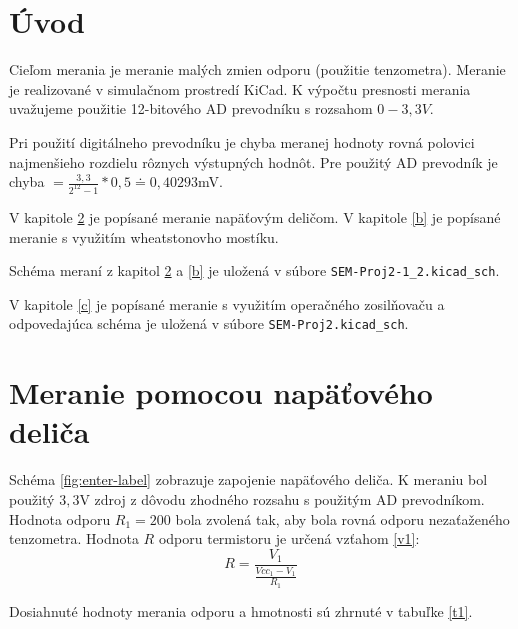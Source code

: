 \section{Úvod}
Cieľom merania je meranie malých zmien odporu (použitie tenzometra). Meranie je realizované v simulačnom prostredí KiCad. K výpočtu presnosti merania uvažujeme použitie 12-bitového AD prevodníku s rozsahom $0-3,3V$.

Pri použití digitálneho prevodníku je chyba meranej hodnoty rovná polovici najmenšieho rozdielu rôznych výstupných hodnôt. Pre použitý AD prevodník je chyba $ = \frac{3,3}{2^{12}-1}*0,5 \doteq 0,40293$mV. 

V kapitole \ref{a} je popísané meranie napäťovým deličom.
V kapitole \ref{b} je popísané meranie s využitím wheatstonovho mostíku.

Schéma meraní z kapitol \ref{a} a \ref{b} je uložená v súbore \texttt{SEM-Proj2-1\_2.kicad\_sch}.

V kapitole \ref{c} je popísané meranie s využitím operačného zosilňovaču a odpovedajúca schéma je uložená v súbore \texttt{SEM-Proj2.kicad\_sch}.

\section{Meranie pomocou napäťového deliča}
\label{a}

Schéma \ref{fig:enter-label} zobrazuje zapojenie napäťového deliča.
K meraniu bol použitý $3,3$V zdroj z dôvodu zhodného rozsahu s použitým AD prevodníkom.
Hodnota odporu $R_1 = 200$ bola zvolená tak, aby bola rovná odporu nezaťaženého tenzometra. 
Hodnota $R$ odporu termistoru je určená vzťahom \ref{v1}:
\begin{equation}
    \label{v1}
    R = \frac{V_1}{\frac{Vcc_1 - V_1}{R_1}}
\end{equation}

Dosiahnuté hodnoty merania odporu a hmotnosti sú zhrnuté v tabuľke \ref{t1}.



